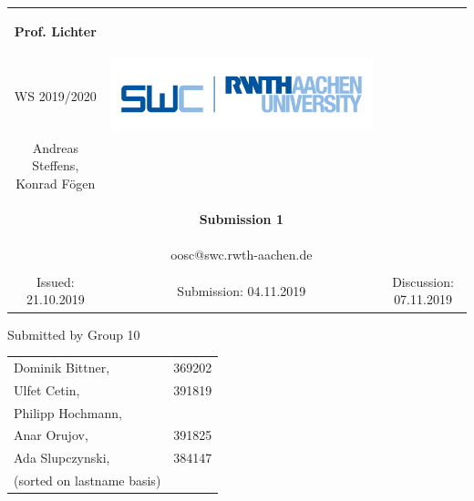 \documentclass[a4paper,12pt,oneside]{scrreprt}
\begin{document}
	
\begin{tabular}{ccc}
	\begin{large} \textbf{Prof. Lichter} \end{large} &
	
	\begin{minipage}[H]{3.5cm}
	\centering
		\begin{large} OOSC \end{large} \\
		\begin{large} WS 2019/2020 \end{large}
	\end{minipage} &
	
	\begin{minipage}[H]{4cm}
		\includegraphics[keepaspectratio,width=\textwidth,angle=0]{images/swc.png}
	\end{minipage} \\
Andreas Steffens, Konrad F\"ogen &  &  \\
& \begin{huge} \textbf{Submission 1} \end{huge}&  \\
& oosc@swc.rwth-aachen.de &  \\
& & \\
Issued: 21.10.2019 &
Submission: 04.11.2019 &
Discussion: 07.11.2019 \\
\end{tabular}
\newline \newline \newline
\centering
Submitted by Group 10

\begin{tabular}{ll}
	Dominik Bittner, & 369202 \\
	Ulfet Cetin, & 391819\\
 	Philipp Hochmann, \\
 	Anar Orujov, & 391825\\
 	Ada Slupczynski, & 384147\\
 	(sorted on lastname basis)
\end{tabular}
\end{document}
